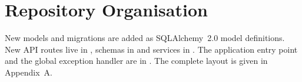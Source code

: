 \section{Repository Organisation}

New models and migrations are added as SQLAlchemy~2.0 model definitions. New API routes live in , schemas in  and services in . The application entry point and the global exception handler are in . The complete layout is given in Appendix~A.
